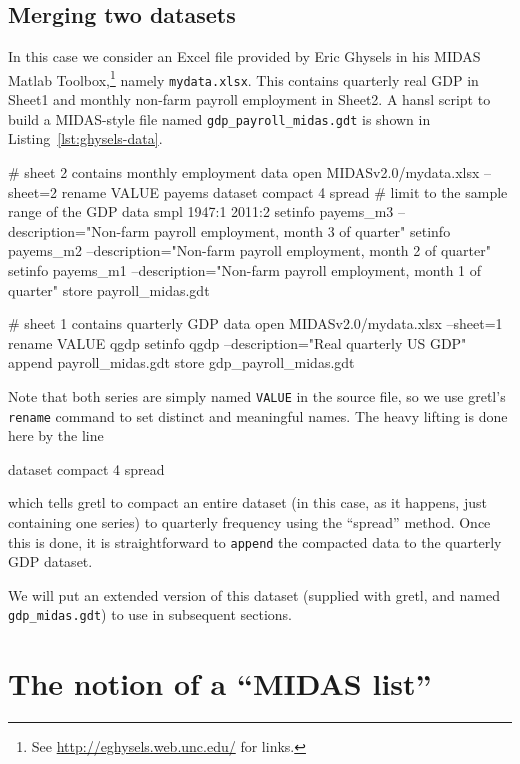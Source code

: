 \subsection{Merging two datasets}
\label{sec:data-merge}

In this case we consider an Excel file provided by Eric Ghysels in his
\textsf{MIDAS Matlab Toolbox},\footnote{See
  \url{http://eghysels.web.unc.edu/} for links.} namely
\texttt{mydata.xlsx}.  This contains quarterly real GDP in Sheet1 and
monthly non-farm payroll employment in Sheet2. A hansl script to build
a MIDAS-style file named \texttt{gdp\_payroll\_midas.gdt} is shown in
Listing~\ref{lst:ghysels-data}.

\begin{script}[htbp]
  \label{lst:ghysels-data}
\begin{scode}
# sheet 2 contains monthly employment data
open MIDASv2.0/mydata.xlsx --sheet=2
rename VALUE payems
dataset compact 4 spread
# limit to the sample range of the GDP data
smpl 1947:1 2011:2
setinfo payems_m3 --description="Non-farm payroll employment, month 3 of quarter"
setinfo payems_m2 --description="Non-farm payroll employment, month 2 of quarter"
setinfo payems_m1 --description="Non-farm payroll employment, month 1 of quarter"
store payroll_midas.gdt

# sheet 1 contains quarterly GDP data
open MIDASv2.0/mydata.xlsx --sheet=1
rename VALUE qgdp
setinfo qgdp --description="Real quarterly US GDP"
append payroll_midas.gdt
store gdp_payroll_midas.gdt
\end{scode}
\end{script}

Note that both series are simply named \texttt{VALUE} in the source
file, so we use gretl's \texttt{rename} command to set distinct and
meaningful names. The heavy lifting is done here by the line
%
\begin{code}
dataset compact 4 spread
\end{code}
%
which tells gretl to compact an entire dataset (in this case, as it
happens, just containing one series) to quarterly frequency using the
``spread'' method. Once this is done, it is straightforward to
\texttt{append} the compacted data to the quarterly GDP dataset.

We will put an extended version of this dataset (supplied with gretl,
and named \texttt{gdp\_midas.gdt}) to use in subsequent sections.

\section{The notion of a ``MIDAS list''}
\label{sec:midas-list}

